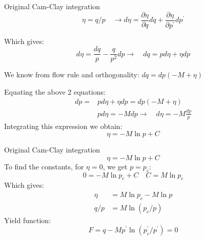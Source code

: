 \documentclass[notes]{beamer}
\begin{document}
\begin{frame}{Original Cam-Clay integration}
	\begin{equation*}
	\eta = q/p \quad \rightarrow d\eta = \frac{\partial \eta}{\partial q} dq + \frac{\partial \eta}{\partial p^\prime} dp^\prime
	\end{equation*}

Which gives:
	\begin{equation*}
		d\eta = \frac{dq}{p} - \frac{q}{p^2} dp \rightarrow \quad dq = p d\eta + \eta dp
	\end{equation*}

We know from flow rule and orthogonality: $dq = dp (-M + \eta)$

Equating the above 2 equations:
	\begin{align*}
		dp = & p d\eta + \eta dp =  dp (-M + \eta) \\
		& p d \eta = -M dp \rightarrow \quad d\eta = -M \frac{dp}{p}
	\end{align*}
Integrating this expression we obtain:
	\begin{equation}
		\eta = -M \ln p + C
	\end{equation}
\end{frame}

\begin{frame}{Original Cam-Clay integration}
	\begin{equation}
	\eta = -M \ln p + C
	\end{equation}
To find the constants, for $\eta = 0$, we get $p = p_c$:
	\begin{equation*}
		0 = -M \ln p_c + C \quad C = M \ln p_c
	\end{equation*}
Which gives:
	\begin{align*}
		\eta &= M \ln p_c - M \ln p \\
		q/p &= M \ln \left(p_c/p\right)
	\end{align*}
Yield function:
	\begin{equation*}
		F = q - M p^\prime \ln(p_c^\prime / p^\prime) = 0
	\end{equation*}
\end{frame}
\end{document}
